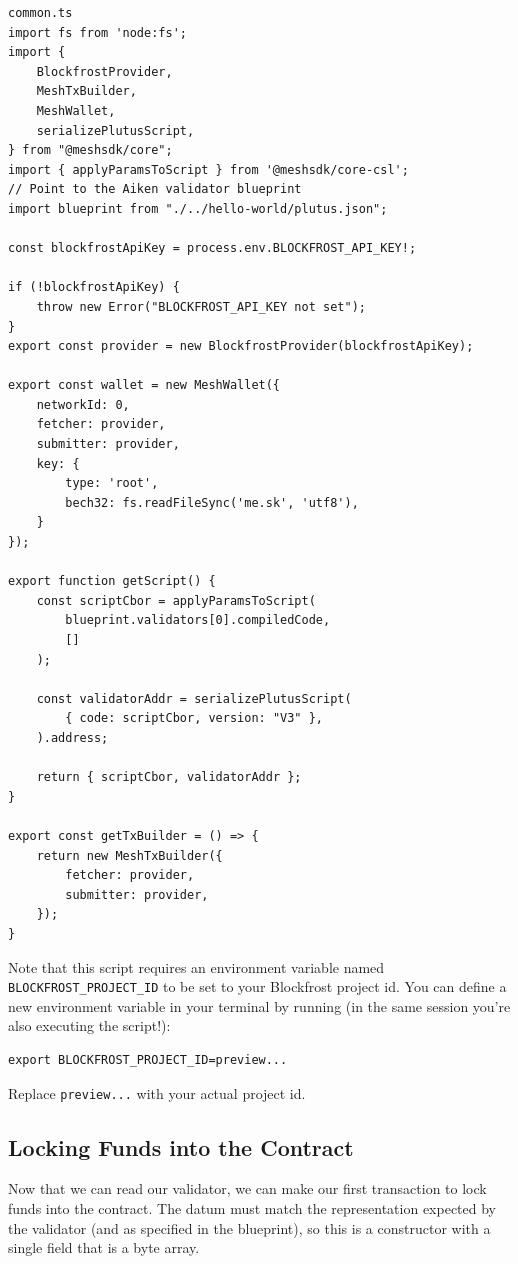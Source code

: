 \begin{verbatim}
common.ts
import fs from 'node:fs';
import {
    BlockfrostProvider,
    MeshTxBuilder,
    MeshWallet,
    serializePlutusScript,
} from "@meshsdk/core";
import { applyParamsToScript } from '@meshsdk/core-csl';
// Point to the Aiken validator blueprint
import blueprint from "./../hello-world/plutus.json";

const blockfrostApiKey = process.env.BLOCKFROST_API_KEY!;

if (!blockfrostApiKey) {
    throw new Error("BLOCKFROST_API_KEY not set");
}
export const provider = new BlockfrostProvider(blockfrostApiKey);

export const wallet = new MeshWallet({
    networkId: 0,
    fetcher: provider,
    submitter: provider,
    key: {
        type: 'root',
        bech32: fs.readFileSync('me.sk', 'utf8'),
    }
});

export function getScript() {
    const scriptCbor = applyParamsToScript(
        blueprint.validators[0].compiledCode,
        []
    );

    const validatorAddr = serializePlutusScript(
        { code: scriptCbor, version: "V3" },
    ).address;

    return { scriptCbor, validatorAddr };
}

export const getTxBuilder = () => {
    return new MeshTxBuilder({
        fetcher: provider,
        submitter: provider,
    });
}
\end{verbatim}

Note that this script requires an environment variable named \texttt{BLOCKFROST\_PROJECT\_ID} to be set to your Blockfrost project id. You can define a new environment variable in your terminal by running (in the same session you're also executing the script!):

\begin{verbatim}
export BLOCKFROST_PROJECT_ID=preview...
\end{verbatim}

Replace \texttt{preview...} with your actual project id.

\subsection{Locking Funds into the Contract}
Now that we can read our validator, we can make our first transaction to lock funds into the contract. The datum must match the representation expected by the validator (and as specified in the blueprint), so this is a constructor with a single field that is a byte array.

